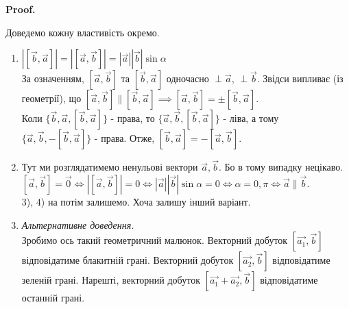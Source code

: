 \documentclass[a4paper, 10pt]{extarticle}
\makeatletter
\def\qed{$\blacksquare$}
\def\qed{$\blacksquare$}
\theoremstyle{theoremdd}
\theoremstyle{theoremdd}
\theoremstyle{theoremdd}
\theoremstyle{theoremdd}
\theoremstyle{theoremdd}
\theoremstyle{theoremdd}
\theoremstyle{theoremdd}
\theoremstyle{theoremdd}
\renewenvironment{proof}[1][Proof.\\]{\par
\pushQED{\hfill \qed}%
\normalfont \topsep6\p@\@plus6\p@\relax
\trivlist
\item\relax
{\bfseries
#1\@addpunct{.}}\hspace\labelsep\ignorespaces
}{%
\popQED\endtrivlist\@endpefalse
}
\makeatother
\begin{document}
\begin{proof}
Доведемо кожну властивість окремо.
\begin{enumerate}[wide=0pt,label={\arabic*)}]
\item $|[\vec{b}, \vec{a}]| = |[\vec{a}, \vec{b}]| = |\vec{a}| |\vec{b}| \sin \alpha$\\
За означенням, $[\vec{a}, \vec{b}]$ та $[\vec{b}, \vec{a}]$ одночасно $\perp \vec{a}$, $\perp \vec{b}$. Звідси випливає (із геометрії), що
$[\vec{a}, \vec{b}] \parallel [\vec{b}, \vec{a}] \implies [\vec{a}, \vec{b}] = \pm [\vec{b}, \vec{a}]$.\\
Коли $\{\vec{b}, \vec{a}, [\vec{b}, \vec{a}]\}$ - права, то $\{\vec{a}, \vec{b}, [\vec{b}, \vec{a}]\}$ - ліва, а тому $\{\vec{a}, \vec{b}, -[\vec{b}, \vec{a}]\}$ - права. Отже, $[\vec{b},\vec{a}] = -[\vec{a}, \vec{b}]$.

\item Тут ми розглядатимемо ненульові вектори $\vec{a},\vec{b}$. Бо в тому випадку нецікаво.\\
$[\vec{a}, \vec{b}] = \vec{0} \iff |[\vec{a}, \vec{b}]| = 0 \iff |\vec{a}| |\vec{b}| \sin \alpha = 0 \iff \alpha = 0,\pi \iff \vec{a} \parallel \vec{b}$.\bigskip \\
3), 4) на потім залишемо. Хоча залишу інший варіант.\\
\item \textit{Альтернативне доведення.}\\
Зробимо ось такий геометричний малюнок. Векторний добуток $[\vec{a_1},\vec{b}]$ відповідатиме блакитній грані. Векторний добуток $[\vec{a_2},\vec{b}]$ відповідатиме зеленій грані. Нарешті, векторний добуток $[\vec{a_1}+\vec{a_2}, \vec{b}]$ відповідатиме останній грані.
\begin{figure}[H]
\centering
{}
\end{figure}
\end{enumerate}
\end{proof}
\end{document}
